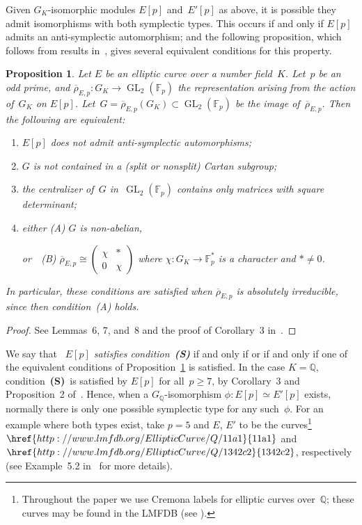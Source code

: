 \documentclass[twoside,leqno,symbols-for-thanks, draft]{rmi}
\numberwithin{equation}{section}
\newcommand{\lmfdbec}[3]{\href{http://www.lmfdb.org/EllipticCurve/Q/#1#2#3}{{\text{\rm#1#2#3}}}}
\newcommand{\condS}{condition~{\bf (S)}}
\newcommand{\Fp}{\mathbb{F}_p}
\newcommand{\Fpstar}{\mathbb{F}_p^*}
\newcommand{\Q}{\mathbb{Q}}
\newcommand{\rhobar}{{\overline{\rho}}}
\newcommand{\GL}{\operatorname{GL}}
\newtheorem{proposition}[theorem]{Proposition}
\theoremstyle{remark}
\begin{document}
Given $G_K$-isomorphic modules $E[p]$ and~$E'[p]$ as above, it is
possible they admit isomorphisms with both symplectic types.  This
occurs if and only if $E[p]$ admits an anti-symplectic automorphism;
and the following proposition, which follows from results
in~\cite{FKSym}, gives several equivalent conditions for this property.

\begin{proposition} \label{P:conditionS}
Let $E$ be an elliptic curve over a number field~$K$. Let~$p$ be an
odd prime, and $\rhobar_{E,p} : G_K \to \GL_2(\Fp)$ the representation
arising from the action of~$G_K$ on $E[p]$.
Let~$G=\rhobar_{E,p}(G_K)\subset \GL_2(\Fp)$ be the image
of~$\rhobar_{E,p}$.  Then the following are equivalent:
\begin{enumerate}
\item $E[p]$ does not admit anti-symplectic automorphisms;
\item $G$ is not contained in a (split or nonsplit) Cartan subgroup;
\item the centralizer of~$G$ in~$\GL_2(\Fp)$ contains only matrices
  with square determinant;
\item either (A) $G$ is non-abelian,

  or\ \ (B) $\rhobar_{E,p} \cong \left( \begin{smallmatrix} \chi & * \\ 0 & \chi \end{smallmatrix} \right)$ where $\chi : G_K \to \Fpstar$ is a character
 and $* \neq 0$.
\end{enumerate}
In particular, these conditions are satisfied when $\rhobar_{E,p}$ is
absolutely irreducible, since then condition~(A) holds.
\end{proposition}
\begin{proof} See Lemmas~6, 7, and~8 and the proof of Corollary~3 in~\cite{FKSym}.
 \end{proof}

We say that \emph{~$E[p]$ satisfies \condS} if and only if or if and
only if one of the equivalent conditions of
Proposition~\ref{P:conditionS} is satisfied.  In the case $K=\Q$,
\condS\ is satisfied by $E[p]$ for all~$p\ge7$, by Corollary~3
  and Proposition~2 of~\cite{FKSym}.  Hence, when a $G_\Q$-isomorphism $\phi :
E[p] \simeq E'[p]$ exists, normally there is only one possible
symplectic type for any such~$\phi$.  For an example where both types
exist, take $p=5$ and $E$, $E'$ to be the curves\footnote{Throughout
  the paper we use Cremona labels for elliptic curves over~$\Q$; these
  curves may be found in the LMFDB (see \cite{lmfdb}).}
$\lmfdbec{11}{a}{1}$ and $\lmfdbec{1342}{c}{2}$, respectively
(see Example~5.2 in~\cite{FKSym} for more details).
\end{document}
